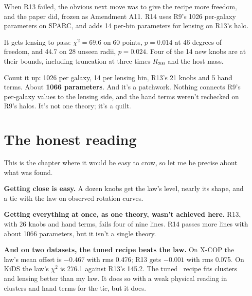 When R13 failed, the obvious next move was to give the recipe more freedom, and the paper did, frozen as Amendment A11. R14 uses R9's 1026 per-galaxy parameters on SPARC, and adds 14 per-bin parameters for lensing on R13's halo.

It gets lensing to pass: $\chi^2=69.6$ on 60 points, $p=0.014$ at 46 degrees of freedom, and 44.7 on 28 unseen radii, $p=0.024$. Four of the 14 new knobs are at their bounds, including truncation at three times $R_{200}$ and the host mass.

Count it up: 1026 per galaxy, 14 per lensing bin, R13's 21 knobs and 5 hand terms. About \textbf{1066 parameters}. And it's a patchwork. Nothing connects R9's per-galaxy values to the lensing side, and the hand terms weren't rechecked on R9's halos. It's not one theory; it's a quilt.




\section{The honest reading}

This is the chapter where it would be easy to crow, so let me be precise about what was found.

\textbf{Getting close is easy.} A dozen knobs get the law's level, nearly its shape, and a tie with the law on observed rotation curves.

\textbf{Getting everything at once, as one theory, wasn't achieved here.} R13, with 26 knobs and hand terms, fails four of nine lines. R14 passes more lines with about 1066 parameters, but it isn't a single theory.

\textbf{And on two datasets, the tuned recipe beats the law.} On X-COP the law's mean offset is $-0.467$ with rms 0.476; R13 gets $-0.001$ with rms 0.075. On KiDS the law's $\chi^2$ is 276.1 against R13's 145.2. The tuned \LCDM\ recipe fits clusters and lensing better than my law. It does so with a weak physical reading in clusters and hand terms for the tie, but it does.



